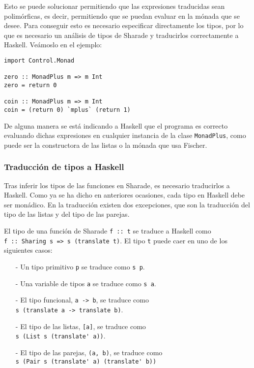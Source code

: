 \documentclass[class=article, crop=false]{standalone}
\begin{document}
Esto se puede solucionar permitiendo que las expresiones traducidas sean polimórficas, es
decir, permitiendo que se puedan evaluar en la mónada que se desee. Para conseguir esto es
necesario especificar directamente los tipos, por lo que es necesario un análisis de tipos de
Sharade y traducirlos correctamente a Haskell. Veámoslo en el ejemplo:

\begin{verbatim}
import Control.Monad

zero :: MonadPlus m => m Int
zero = return 0

coin :: MonadPlus m => m Int
coin = (return 0) `mplus` (return 1)
\end{verbatim}

De alguna manera se está indicando a Haskell que el programa es correcto evaluando dichas
expresiones en cualquier instancia de la clase \verb`MonadPlus`, como puede ser la
constructora de las listas o la mónada que usa Fischer.

\subsubsection{Traducción de tipos a Haskell}

Tras inferir los tipos de las funciones en Sharade, es necesario traducirlos a Haskell. Como
ya se ha dicho en anteriores ocasiones, cada tipo en Haskell debe ser monádico. En la
traducción existen dos excepciones, que son la traducción del tipo de las listas y del tipo
de las parejas.

El tipo de una función de Sharade \verb`f :: t` se traduce a Haskell como \\
\verb`f :: Sharing s => s (translate t)`. El tipo \verb`t` puede caer en uno de los
siguientes casos:

\begin{itemize}
  \item[-] Un tipo primitivo \verb`p` se traduce como \verb`s p`.
  \item[-] Una variable de tipos \verb`a` se traduce como \verb`s a`.
  \item[-] El tipo funcional, \verb`a -> b`, se traduce como \\
  \verb`s (translate a -> translate b)`.

  \item[-] El tipo de las listas, \verb`[a]`, se traduce como \\
  \verb`s (List s (translate' a))`.

  \item[-] El tipo de las parejas, \verb`(a, b)`, se traduce como \\
  \verb`s (Pair s (translate' a) (translate' b))`
\end{itemize}
\end{document}
